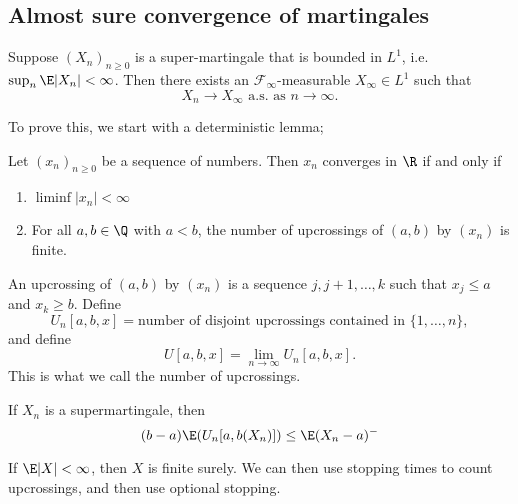 \documentclass[a4paper]{article}
\begin{document}
\subsection{Almost sure convergence of martingales}

\begin{thm}
  Suppose $(X_n)_{n \geq 0}$ is a super-martingale that is bounded in $L^1$, i.e.\ $\sup_n \E|X_n| < \infty$. Then there exists an $\mathcal{F}_\infty$-measurable $X_\infty \in L^1$ such that
  \[
    X_n \to X_\infty\text{ a.s. as }n \to \infty.
  \]
\end{thm}

To prove this, we start with a deterministic lemma;
\begin{lemma}
  Let $(x_n)_{n \geq 0}$ be a sequence of numbers. Then $x_n$ converges in $\R$ if and only if
  \begin{enumerate}
    \item $\liminf |x_n| < \infty$
    \item For all $a, b \in \Q$ with $a < b$, the number of upcrossings of $(a, b)$ by $(x_n)$ is finite.\hfill\qedsymbol
  \end{enumerate}
\end{lemma}
An upcrossing of $(a, b)$ by $(x_n)$ is a sequence $j, j + 1, \ldots, k$ such that $x_j \leq a$ and $x_k \geq b$. Define
\[
  U_n[a, b, x] = \text{number of disjoint upcrossings contained in }\{1, \ldots, n\},
\]
and define
\[
  U[a, b, x] = \lim_{n \to \infty} U_n[a, b, x].
\]
This is what we call the number of upcrossings.

\begin{lemma}
  If $X_n$ is a supermartingale, then
  \[
    (b - a) \E(U_n[a, b(X_n)]) \leq \E(X_n - a)^-
  \]
\end{lemma}
If $\E|X| < \infty$, then $X$ is finite surely. We can then use stopping times to count upcrossings, and then use optional stopping.
\end{document}

